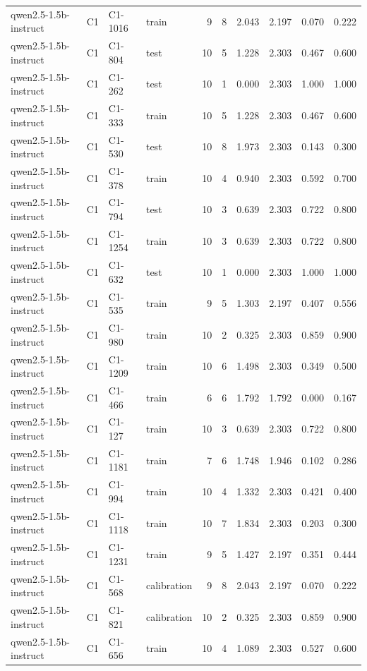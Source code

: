 \begin{table}
\begin{tabular}{llllrrrrrr}
qwen2.5-1.5b-instruct & C1 & C1-1016 & train & 9 & 8 & 2.043 & 2.197 & 0.070 & 0.222 \\
qwen2.5-1.5b-instruct & C1 & C1-804 & test & 10 & 5 & 1.228 & 2.303 & 0.467 & 0.600 \\
qwen2.5-1.5b-instruct & C1 & C1-262 & test & 10 & 1 & 0.000 & 2.303 & 1.000 & 1.000 \\
qwen2.5-1.5b-instruct & C1 & C1-333 & train & 10 & 5 & 1.228 & 2.303 & 0.467 & 0.600 \\
qwen2.5-1.5b-instruct & C1 & C1-530 & test & 10 & 8 & 1.973 & 2.303 & 0.143 & 0.300 \\
qwen2.5-1.5b-instruct & C1 & C1-378 & train & 10 & 4 & 0.940 & 2.303 & 0.592 & 0.700 \\
qwen2.5-1.5b-instruct & C1 & C1-794 & test & 10 & 3 & 0.639 & 2.303 & 0.722 & 0.800 \\
qwen2.5-1.5b-instruct & C1 & C1-1254 & train & 10 & 3 & 0.639 & 2.303 & 0.722 & 0.800 \\
qwen2.5-1.5b-instruct & C1 & C1-632 & test & 10 & 1 & 0.000 & 2.303 & 1.000 & 1.000 \\
qwen2.5-1.5b-instruct & C1 & C1-535 & train & 9 & 5 & 1.303 & 2.197 & 0.407 & 0.556 \\
qwen2.5-1.5b-instruct & C1 & C1-980 & train & 10 & 2 & 0.325 & 2.303 & 0.859 & 0.900 \\
qwen2.5-1.5b-instruct & C1 & C1-1209 & train & 10 & 6 & 1.498 & 2.303 & 0.349 & 0.500 \\
qwen2.5-1.5b-instruct & C1 & C1-466 & train & 6 & 6 & 1.792 & 1.792 & 0.000 & 0.167 \\
qwen2.5-1.5b-instruct & C1 & C1-127 & train & 10 & 3 & 0.639 & 2.303 & 0.722 & 0.800 \\
qwen2.5-1.5b-instruct & C1 & C1-1181 & train & 7 & 6 & 1.748 & 1.946 & 0.102 & 0.286 \\
qwen2.5-1.5b-instruct & C1 & C1-994 & train & 10 & 4 & 1.332 & 2.303 & 0.421 & 0.400 \\
qwen2.5-1.5b-instruct & C1 & C1-1118 & train & 10 & 7 & 1.834 & 2.303 & 0.203 & 0.300 \\
qwen2.5-1.5b-instruct & C1 & C1-1231 & train & 9 & 5 & 1.427 & 2.197 & 0.351 & 0.444 \\
qwen2.5-1.5b-instruct & C1 & C1-568 & calibration & 9 & 8 & 2.043 & 2.197 & 0.070 & 0.222 \\
qwen2.5-1.5b-instruct & C1 & C1-821 & calibration & 10 & 2 & 0.325 & 2.303 & 0.859 & 0.900 \\
qwen2.5-1.5b-instruct & C1 & C1-656 & train & 10 & 4 & 1.089 & 2.303 & 0.527 & 0.600 \\

\end{tabular}
\end{table}
